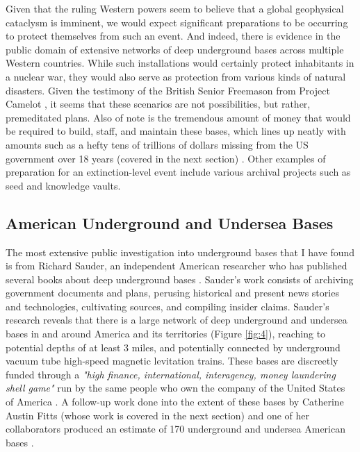 \documentclass[10pt,twocolumn,letterpaper]{article}
\begin{document}
Given that the ruling Western powers seem to believe that a global geophysical cataclysm is imminent, we would expect significant preparations to be occurring to protect themselves from such an event. And indeed, there is evidence in the public domain of extensive networks of deep underground bases across multiple Western countries. While such installations would certainly protect inhabitants in a nuclear war, they would also serve as protection from various kinds of natural disasters. Given the testimony of the British Senior Freemason from Project Camelot \cite{4,6}, it seems that these scenarios are not possibilities, but rather, premeditated plans. Also of note is the tremendous amount of money that would be required to build, staff, and maintain these bases, which lines up neatly with amounts such as a hefty tens of trillions of dollars missing from the US government over 18 years (covered in the next section) \cite{11,12,13}. Other examples of preparation for an extinction-level event include various archival projects such as seed and knowledge vaults.

\subsection{American Underground and Undersea Bases}

The most extensive public investigation into underground bases that I have found is from Richard Sauder, an independent American researcher who has published several books about deep underground bases \cite{22}. Sauder's work consists of archiving government documents and plans, perusing historical and present news stories and technologies, cultivating sources, and compiling insider claims. Sauder's research reveals that there is a large network of deep underground and undersea bases in and around America and its territories (Figure \ref{fig:4}), reaching to potential depths of at least 3 miles, and potentially connected by underground vacuum tube high-speed magnetic levitation trains. These bases are discreetly funded through a \textit{"high finance, international, interagency, money laundering shell game"} run by the same people who own the company of the United States of America \cite{22}. A follow-up work done into the extent of these bases by Catherine Austin Fitts (whose work is covered in the next section) and one of her collaborators produced an estimate of 170 underground and undersea American bases \cite{16,20}.
\end{document}
